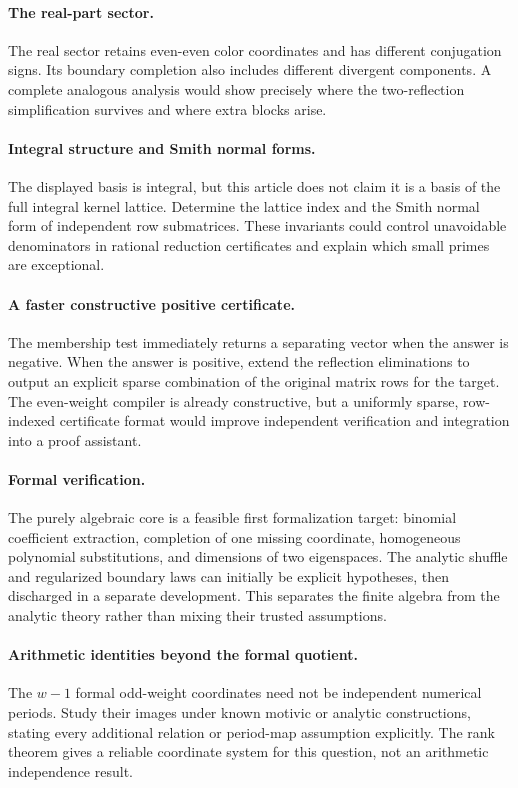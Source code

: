 \documentclass[11pt,a4paper]{article}
\numberwithin{equation}{section}
\theoremstyle{definition}\newtheorem{definition}[theorem]{Definition}
\theoremstyle{remark}\newtheorem{remark}[theorem]{Remark}
\begin{document}
\paragraph{The real-part sector.}
The real sector retains even-even color coordinates and has different
conjugation signs. Its boundary completion also includes different divergent
components. A complete analogous analysis would show precisely where the
two-reflection simplification survives and where extra blocks arise.

\paragraph{Integral structure and Smith normal forms.}
The displayed basis is integral, but this article does not claim it is a
basis of the full integral kernel lattice. Determine the lattice index and
the Smith normal form of independent row submatrices. These invariants could
control unavoidable denominators in rational reduction certificates and
explain which small primes are exceptional.

\paragraph{A faster constructive positive certificate.}
The membership test immediately returns a separating vector when the answer
is negative. When the answer is positive, extend the reflection eliminations
to output an explicit sparse combination of the original matrix rows for the
target. The even-weight compiler is already constructive, but a uniformly
sparse, row-indexed certificate format would improve independent verification
and integration into a proof assistant.

\paragraph{Formal verification.}
The purely algebraic core is a feasible first formalization target: binomial
coefficient extraction, completion of one missing coordinate, homogeneous
polynomial substitutions, and dimensions of two eigenspaces. The analytic
shuffle and regularized boundary laws can initially be explicit hypotheses,
then discharged in a separate development. This separates the finite algebra
from the analytic theory rather than mixing their trusted assumptions.

\paragraph{Arithmetic identities beyond the formal quotient.}
The $w-1$ formal odd-weight coordinates need not be independent numerical
periods. Study their images under known motivic or analytic constructions,
stating every additional relation or period-map assumption explicitly.
The rank theorem gives a reliable coordinate system for this question, not
an arithmetic independence result.
\end{document}

